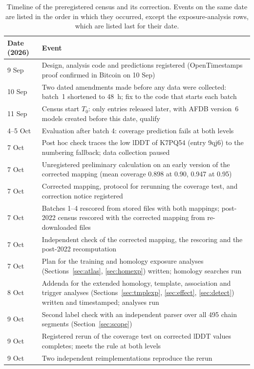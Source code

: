 \documentclass{article}
\begin{document}
\begin{table}[!h]
\centering
\caption{Timeline of the preregistered census and its correction. Events on the same date are listed in the order in which they occurred, except the exposure-analysis rows, which are listed last for their date.}
\label{tab:timeline}
\small
\begin{tabular}{@{}lp{13.2cm}@{}}
\toprule
Date (2026) & Event \\
\midrule
9 Sep & Design, analysis code and predictions registered (OpenTimestamps proof confirmed in Bitcoin on 10 Sep) \\
10 Sep & Two dated amendments made before any data were collected: batch~1 shortened to 48~h; fix to the code that starts each batch \\
11 Sep & Census start $T_0$: only entries released later, with AFDB version~6 models created before this date, qualify \\
4--5 Oct & Evaluation after batch 4: coverage prediction fails at both levels \\
7 Oct & Post hoc check traces the low lDDT of K7PQ54 (entry 9qj6) to the numbering fallback; data collection paused \\
7 Oct & Unregistered preliminary calculation on an early version of the corrected mapping (mean coverage 0.898 at 0.90, 0.947 at 0.95) \\
7 Oct & Corrected mapping, protocol for rerunning the coverage test, and correction notice registered \\
7 Oct & Batches 1--4 rescored from stored files with both mappings; post-2022 census rescored with the corrected mapping from re-downloaded files \\
7 Oct & Independent check of the corrected mapping, the rescoring and the post-2022 recomputation \\
7 Oct & Plan for the training and homology exposure analyses (Sections~\ref{sec:atlas}, \ref{sec:homexp}) written; homology searches run \\
8 Oct & Addenda for the extended homology, template, association and trigger analyses (Sections~\ref{sec:tmplexp}, \ref{sec:effect}, \ref{sec:detect}) written and timestamped; analyses run \\
9 Oct & Second label check with an independent parser over all 495 chain segments (Section~\ref{sec:scope}) \\
9 Oct & Registered rerun of the coverage test on corrected lDDT values completes; meets the rule at both levels \\
9 Oct & Two independent reimplementations reproduce the rerun \\
\bottomrule
\end{tabular}
\end{table}
\end{document}

